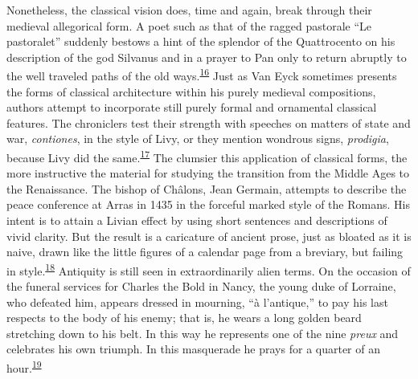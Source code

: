 Nonetheless, the classical vision does, time and again, break through
their medieval allegorical form. A poet such as that of the ragged
pastorale ``Le pastoralet'' suddenly bestows a hint of the splendor of
the Quattrocento on his description of the god Silvanus and in a prayer
to Pan only to return abruptly to the well traveled paths of the old
ways.\textsuperscript{\protect\hypertarget{22_Chapter_Fourteen__THE_COMING_OF.xhtmlux5cux23id_92}{\protect\hyperlink{23_NOTES.xhtmlux5cux23id_93}{16}}}
Just as Van Eyck sometimes presents the forms of classical architecture
within his purely medieval compositions, authors attempt to incorporate
still purely formal and ornamental classical features. The chroniclers
test their strength with speeches on matters of state and war,
\emph{contiones}, in the style of Livy, or they mention wondrous signs,
\emph{prodigia}, because Livy did the
same.\textsuperscript{\protect\hypertarget{22_Chapter_Fourteen__THE_COMING_OF.xhtmlux5cux23id_90}{\protect\hyperlink{23_NOTES.xhtmlux5cux23id_91}{17}}}
The clumsier this application of classical forms, the more
\protect\hypertarget{22_Chapter_Fourteen__THE_COMING_OF.xhtmlux5cux23page_387}{}{}instructive
the material for studying the transition from the Middle Ages to the
Renaissance. The bishop of Châlons, Jean Germain, attempts to describe
the peace conference at Arras in 1435 in the forceful marked style of
the Romans. His intent is to attain a Livian effect by using short
sentences and descriptions of vivid clarity. But the result is a
caricature of ancient prose, just as bloated as it is naive, drawn like
the little figures of a calendar page from a breviary, but failing in
style.\textsuperscript{\protect\hypertarget{22_Chapter_Fourteen__THE_COMING_OF.xhtmlux5cux23id_88}{\protect\hyperlink{23_NOTES.xhtmlux5cux23id_89}{18}}}
Antiquity is still seen in extraordinarily alien terms. On the occasion
of the funeral services for Charles the Bold in Nancy, the young duke of
Lorraine, who defeated him, appears dressed in mourning, ``à
l'antique,'' to pay his last respects to the body of his enemy; that is,
he wears a long golden beard stretching down to his belt. In this way he
represents one of the nine \emph{preux} and celebrates his own triumph.
In this masquerade he prays for a quarter of an
hour.\textsuperscript{\protect\hypertarget{22_Chapter_Fourteen__THE_COMING_OF.xhtmlux5cux23id_86}{\protect\hyperlink{23_NOTES.xhtmlux5cux23id_87}{19}}}


